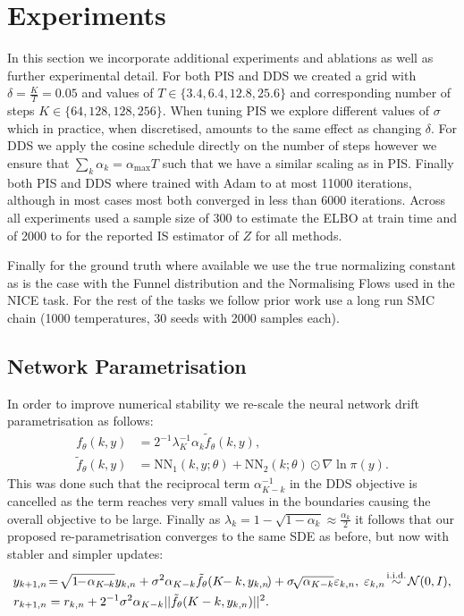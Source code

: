 \documentclass{article} %
\begin{document}
\section{Experiments}

In this section we incorporate additional experiments and ablations as well as further experimental detail. For both PIS and DDS we created a grid with $\delta = \frac{K}{T}= 0.05$ and values of $T \in \{3.4, 6.4, 12.8, 25.6\}$ and corresponding number of steps $K \in \{64, 128, 128, 256\}$. When tuning PIS we explore different values of $\sigma$ which in practice, when discretised, amounts to the same effect as changing $\delta$. For DDS we apply the cosine schedule directly on the number of steps however we ensure that $\sum_k \alpha_k = \alpha_{\max} T$  such that we have a similar scaling as in PIS. Finally both PIS and DDS where trained with Adam \citep{Kingma:2014} to at most 11000 iterations, although in most cases most both converged in less than 6000 iterations. Across all experiments used a sample size of 300 to estimate the ELBO at train time and of 2000 to for the reported IS estimator of $Z$ for all methods.

Finally for the ground truth where available we use the true normalizing constant as is the case with the Funnel distribution and the Normalising Flows used in the NICE \cite{dinh2014nice} task. For the rest of the tasks we follow prior work \citep{zhangyongxinchen2021path,arbel2021annealed} use a long run SMC chain (1000 temperatures, 30 seeds with 2000 samples each).

\subsection{Network Parametrisation}\label{apdx:nnparam}

In order to improve numerical stability we re-scale the neural network drift parametrisation as follows:
\begin{align*}
    f_{\theta}(k, y) &= 2^{-1}\lambda_K^{-1} \alpha_k  \tilde{f}_\theta(k, y), \\
    \tilde{f}_\theta(k, y) &=\mathrm{NN}_1(k, y;\theta) + \mathrm{NN}_2(k;\theta) \odot \nabla \ln  \pi(y).
\end{align*}
This was done such that the reciprocal term  $\alpha_{K-k}^{-1}$ in the DDS objective is cancelled as the term reaches very small values in the boundaries causing the overall objective to be large. Finally as $\lambda_k = 1- \sqrt{1-\alpha_k} \approx \frac{\alpha_k}{2}$ it follows that our proposed re-parametrisation converges to the same SDE as before, but now with stabler and simpler updates:
\begin{align}
 y_{k+1,n}&\!=\!\sqrt{1\!\!-\!\alpha_{K\!-\!k}} y_{k,n}+\sigma^2\alpha_{K-k}\tilde{f}_\theta(K\!\!-k,y_{k,n}\!) +\sigma \!\sqrt{\alpha_{K-k}} \varepsilon_{k,n},\; \varepsilon_{k,n}\! \overset{\textup{i.i.d.}}{\sim}\! \mathcal{N}(0,I),\\
r_{k+1,n} &= r_{k,n} + {2^{-1}\sigma^2 \alpha_{K-k}} || \tilde{f}_\theta(K-k,y_{k,n})||^2.
\end{align}
\end{document}
